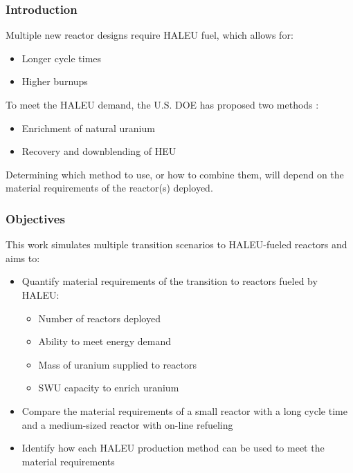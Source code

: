 \begin{frame}
    \frametitle{Introduction}
    Multiple new reactor designs require \gls{HALEU} fuel, which allows for:
    \begin{itemize}
        \item Longer cycle times
        \item Higher burnups 
    \end{itemize}
    To meet the \gls{HALEU} demand, the U.S. \gls{DOE} has proposed two methods
    \cite{griffith_overview_2020}:
    \begin{itemize}
        \item Enrichment of natural uranium
        \item Recovery and downblending of \gls{HEU}
    \end{itemize}
    Determining which method to use, or how to combine them, will depend on 
    the material requirements of the reactor(s) deployed.

\end{frame}

\begin{frame}
    \frametitle{Objectives}
    This work simulates multiple transition scenarios to \gls{HALEU}-fueled 
    reactors and aims to:
    \begin{itemize}
        \item Quantify material requirements of the transition to reactors 
              fueled by \gls{HALEU}:
              \begin{itemize}
                  \item Number of reactors deployed 
                  \item Ability to meet energy demand
                  \item Mass of uranium supplied to reactors
                  \item \gls{SWU} capacity to enrich uranium
              \end{itemize}
        \item Compare the material requirements of a small reactor with a long cycle 
              time and a medium-sized reactor with on-line refueling
        \item Identify how each \gls{HALEU} production method can be used to 
              meet the material requirements
    \end{itemize}
\end{frame}